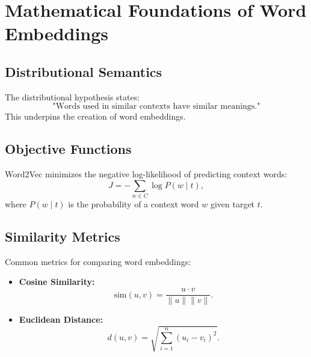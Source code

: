 \section{Mathematical Foundations of Word Embeddings}
\subsection{Distributional Semantics}
The distributional hypothesis states:
\[
\text{"Words used in similar contexts have similar meanings."}
\]
This underpins the creation of word embeddings.

\subsection{Objective Functions}
Word2Vec minimizes the negative log-likelihood of predicting context words:
\[
J = -\sum_{w \in C} \log P(w \mid t),
\]
where \(P(w \mid t)\) is the probability of a context word \(w\) given target \(t\).

\subsection{Similarity Metrics}
Common metrics for comparing word embeddings:
\begin{itemize}
    \item \textbf{Cosine Similarity:}
    \[
    \text{sim}(u, v) = \frac{u \cdot v}{\|u\| \|v\|}.
    \]
    \item \textbf{Euclidean Distance:}
    \[
    d(u, v) = \sqrt{\sum_{i=1}^n (u_i - v_i)^2}.
    \]
\end{itemize}

